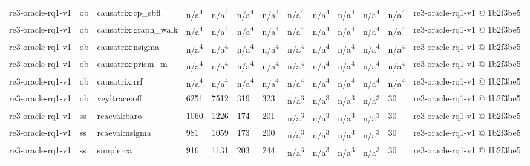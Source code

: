 \begin{table}[t]
\begin{tabular}{lllllllllllll}
re3-oracle-rq1-v1 & ob & causatrix:cp\_sbfl & n/a\textsuperscript{4} & n/a\textsuperscript{4} & n/a\textsuperscript{4} & n/a\textsuperscript{4} & n/a\textsuperscript{4} & n/a\textsuperscript{4} & n/a\textsuperscript{4} & n/a\textsuperscript{4} & n/a\textsuperscript{4} & re3-oracle-rq1-v1 @ 1b2f3be5 \\
re3-oracle-rq1-v1 & ob & causatrix:graph\_walk & n/a\textsuperscript{4} & n/a\textsuperscript{4} & n/a\textsuperscript{4} & n/a\textsuperscript{4} & n/a\textsuperscript{4} & n/a\textsuperscript{4} & n/a\textsuperscript{4} & n/a\textsuperscript{4} & n/a\textsuperscript{4} & re3-oracle-rq1-v1 @ 1b2f3be5 \\
re3-oracle-rq1-v1 & ob & causatrix:nsigma & n/a\textsuperscript{4} & n/a\textsuperscript{4} & n/a\textsuperscript{4} & n/a\textsuperscript{4} & n/a\textsuperscript{4} & n/a\textsuperscript{4} & n/a\textsuperscript{4} & n/a\textsuperscript{4} & n/a\textsuperscript{4} & re3-oracle-rq1-v1 @ 1b2f3be5 \\
re3-oracle-rq1-v1 & ob & causatrix:prism\_m & n/a\textsuperscript{4} & n/a\textsuperscript{4} & n/a\textsuperscript{4} & n/a\textsuperscript{4} & n/a\textsuperscript{4} & n/a\textsuperscript{4} & n/a\textsuperscript{4} & n/a\textsuperscript{4} & n/a\textsuperscript{4} & re3-oracle-rq1-v1 @ 1b2f3be5 \\
re3-oracle-rq1-v1 & ob & causatrix:rrf & n/a\textsuperscript{4} & n/a\textsuperscript{4} & n/a\textsuperscript{4} & n/a\textsuperscript{4} & n/a\textsuperscript{4} & n/a\textsuperscript{4} & n/a\textsuperscript{4} & n/a\textsuperscript{4} & n/a\textsuperscript{4} & re3-oracle-rq1-v1 @ 1b2f3be5 \\
re3-oracle-rq1-v1 & ob & veyltrace:off & 6251 & 7512 & 319 & 323 & n/a\textsuperscript{3} & n/a\textsuperscript{3} & n/a\textsuperscript{3} & n/a\textsuperscript{3} & 30 & re3-oracle-rq1-v1 @ 1b2f3be5 \\
re3-oracle-rq1-v1 & ss & rcaeval:baro & 1060 & 1226 & 174 & 201 & n/a\textsuperscript{3} & n/a\textsuperscript{3} & n/a\textsuperscript{3} & n/a\textsuperscript{3} & 30 & re3-oracle-rq1-v1 @ 1b2f3be5 \\
re3-oracle-rq1-v1 & ss & rcaeval:nsigma & 981 & 1059 & 173 & 200 & n/a\textsuperscript{3} & n/a\textsuperscript{3} & n/a\textsuperscript{3} & n/a\textsuperscript{3} & 30 & re3-oracle-rq1-v1 @ 1b2f3be5 \\
re3-oracle-rq1-v1 & ss & simplerca & 916 & 1131 & 203 & 244 & n/a\textsuperscript{3} & n/a\textsuperscript{3} & n/a\textsuperscript{3} & n/a\textsuperscript{3} & 30 & re3-oracle-rq1-v1 @ 1b2f3be5 \\

\end{tabular}
\end{table}
